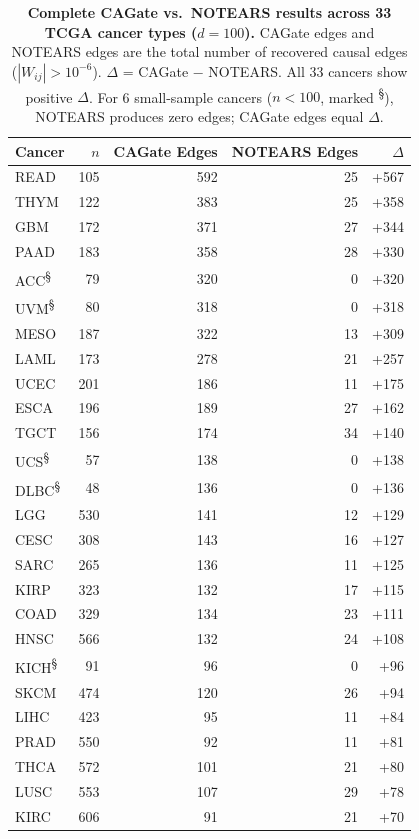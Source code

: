 \documentclass[11pt,a4paper]{article}
\begin{document}
\begin{table}[htbp]
\centering
\caption{\textbf{Complete CAGate vs.\ NOTEARS results across 33 TCGA cancer types ($d=100$).} CAGate edges and NOTEARS edges are the total number of recovered causal edges ($|W_{ij}| > 10^{-6}$). $\Delta$ = CAGate $-$ NOTEARS. All 33 cancers show positive $\Delta$. For 6 small-sample cancers ($n<100$, marked \textsuperscript{\S}), NOTEARS produces zero edges; CAGate edges equal $\Delta$.}
\label{tab:s5}
\small
\begin{tabular}{lrrrr}
\toprule
Cancer & $n$ & CAGate Edges & NOTEARS Edges & $\Delta$ \\
\midrule
READ & 105 & 592 & 25 & +567 \\
THYM & 122 & 383 & 25 & +358 \\
GBM & 172 & 371 & 27 & +344 \\
PAAD & 183 & 358 & 28 & +330 \\
ACC\textsuperscript{\S} & 79 & 320 & 0 & +320 \\
UVM\textsuperscript{\S} & 80 & 318 & 0 & +318 \\
MESO & 187 & 322 & 13 & +309 \\
LAML & 173 & 278 & 21 & +257 \\
UCEC & 201 & 186 & 11 & +175 \\
ESCA & 196 & 189 & 27 & +162 \\
TGCT & 156 & 174 & 34 & +140 \\
UCS\textsuperscript{\S} & 57 & 138 & 0 & +138 \\
DLBC\textsuperscript{\S} & 48 & 136 & 0 & +136 \\
LGG & 530 & 141 & 12 & +129 \\
CESC & 308 & 143 & 16 & +127 \\
SARC & 265 & 136 & 11 & +125 \\
KIRP & 323 & 132 & 17 & +115 \\
COAD & 329 & 134 & 23 & +111 \\
HNSC & 566 & 132 & 24 & +108 \\
KICH\textsuperscript{\S} & 91 & 96 & 0 & +96 \\
SKCM & 474 & 120 & 26 & +94 \\
LIHC & 423 & 95 & 11 & +84 \\
PRAD & 550 & 92 & 11 & +81 \\
THCA & 572 & 101 & 21 & +80 \\
LUSC & 553 & 107 & 29 & +78 \\
KIRC & 606 & 91 & 21 & +70 \\

\end{tabular}
\end{table}
\end{document}
